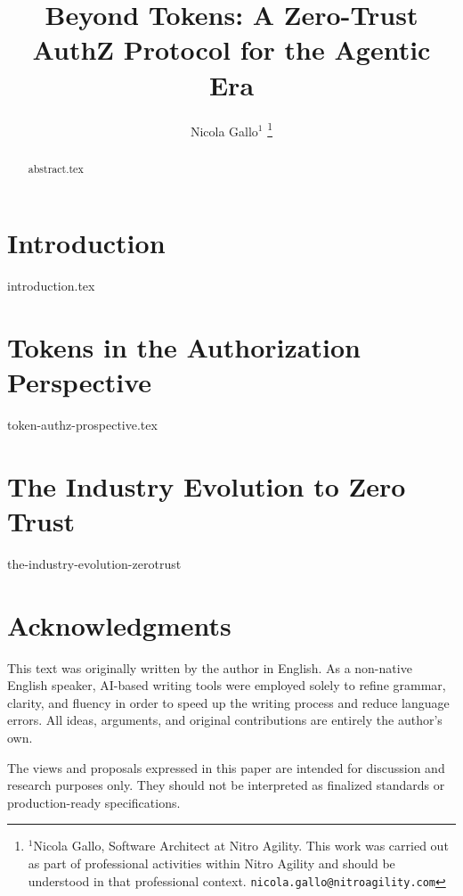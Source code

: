 \documentclass[letterpaper, 10 pt, conference]{ieeeconf}  %
\title{\LARGE \bf
Beyond Tokens: A Zero-Trust AuthZ Protocol for the Agentic Era
}
\author{Nicola Gallo$^{1}$%
\thanks{$^{1}$Nicola Gallo, Software Architect at Nitro Agility. 
This work was carried out as part of professional activities within Nitro Agility and should be understood in that professional context. 
{\tt\small nicola.gallo@nitroagility.com}}%
}
\begin{document}
\maketitle
\thispagestyle{empty}
\pagestyle{empty}

\begin{abstract}
{abstract.tex}
\end{abstract}

\section{Introduction}
\label{sec:introduction}
{introduction.tex}

\section{Tokens in the Authorization Perspective}
\label{sec:token-authz-prospective}
{token-authz-prospective.tex}

\section{The Industry Evolution to Zero Trust}
\label{sec:the-industry-evolution-zerotrust}
{the-industry-evolution-zerotrust}


\section*{Acknowledgments}
This text was originally written by the author in English. 
As a non-native English speaker, AI-based writing tools were employed solely to refine grammar, clarity, and fluency in order to speed up the writing process and reduce language errors.
All ideas, arguments, and original contributions are entirely the author's own.

\vspace{1em}
The views and proposals expressed in this paper are intended for discussion and research purposes only. 
They should not be interpreted as finalized standards or production-ready specifications.

\addtolength{\textheight}{-12cm}   %
\end{document}
